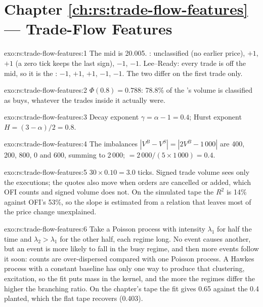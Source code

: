 \section*{Chapter \ref{ch:rs:trade-flow-features} --- Trade-Flow Features}

\begin{solution}{exo:rs:trade-flow-features:1}
The mid is 20.005. : unclassified (no earlier price), $+1$, $+1$ (a zero tick keeps the last sign), $-1$, $-1$. Lee--Ready: every
trade is off the mid, so it is the : $-1$, $+1$, $+1$, $-1$, $-1$. The two differ on the first trade only.
\end{solution}

\begin{solution}{exo:rs:trade-flow-features:2}
$\Phi(0.8) = 0.788$: 78.8\% of the 's volume is classified as buys, whatever the trades inside it actually were.
\end{solution}

\begin{solution}{exo:rs:trade-flow-features:3}
Decay exponent $\gamma = \alpha - 1 = 0.4$; Hurst exponent $H = (3 - \alpha)/2 = 0.8$.
\end{solution}

\begin{solution}{exo:rs:trade-flow-features:4}
The imbalances $|V^B - V^S| = |2V^B - 1\,000|$ are 400, 200, 800, 0 and 600, summing to 2\,000;  $= 2\,000/(5 \times 1\,000) = 0.4$.
\end{solution}

\begin{solution}{exo:rs:trade-flow-features:5}
$30 \times 0.10 = 3.0$ ticks. Signed trade volume sees only the executions; the quotes also move when orders are cancelled or added, which
OFI counts and signed volume does not. On the simulated tape the $R^2$ is 14\% against OFI's 53\%, so the slope is estimated from a
relation that leaves most of the price change unexplained.
\end{solution}

\begin{solution}{exo:rs:trade-flow-features:6}
Take a Poisson process with intensity $\lambda_1$ for half the time and $\lambda_2 > \lambda_1$ for the other half, each regime long. No event
causes another, but an event is more likely to fall in the busy regime, and then more events follow it soon: counts are over-dispersed
compared with one Poisson process. A Hawkes process with a constant baseline has only one way to produce that clustering, excitation, so the
fit puts mass in the kernel, and the more the regimes differ the higher the branching ratio. On the chapter's tape the fit gives 0.65
against the 0.4 planted, which the flat tape recovers (0.403).
\end{solution}


